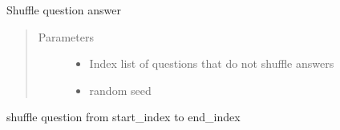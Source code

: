 \documentclass[letterpaper,10pt,english]{sphinxmanual}
\begin{document}
\begin{fulllineitems}
\begin{fulllineitems}
\begin{quote}
\begin{description}
\end{description}\end{quote}

\end{fulllineitems}


\begin{fulllineitems}
\label{\detokenize{index:pytexexam.builder.LatexExamBuilder.shuffle_answer}}
\sphinxAtStartPar
Shuffle question answer
\begin{quote}\begin{description}
\item[{Parameters}] \leavevmode\begin{itemize}
\item {} 
\sphinxAtStartPar
{} \textendash{} Index list of questions that do not shuffle answers

\item {} 
\sphinxAtStartPar
{} \textendash{} random seed

\end{itemize}

\end{description}\end{quote}

\end{fulllineitems}


\begin{fulllineitems}
\label{\detokenize{index:pytexexam.builder.LatexExamBuilder.shuffle_question}}
\sphinxAtStartPar
shuffle question from start\_index to end\_index

\end{fulllineitems}


\end{fulllineitems}
\end{document}
